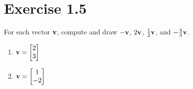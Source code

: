 \section*{Exercise 1.5}
\begin{exercise}
For each vector $\mathbf{v}$, compute and draw
$-\mathbf{v}$, $2\mathbf{v}$, $\tfrac{1}{2}\mathbf{v}$, and $-\tfrac{4}{3}\mathbf{v}$.
\begin{enumerate}
  \item $\mathbf{v} = \begin{bmatrix} 2 \\ 3 \end{bmatrix}$
  \item $\mathbf{v} = \begin{bmatrix} 1 \\ -2 \end{bmatrix}$
\end{enumerate}
\end{exercise}

